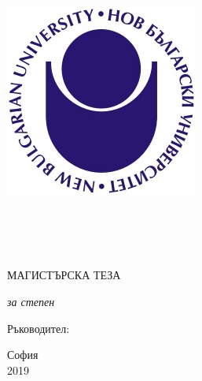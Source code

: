 \documentclass[12pt,bulgarian,singlespacing,headsepline,oneside,openany]{thesis}
\author{\href{https://www.linkedin.com/in/boyana-kantarska-9b1363a3/}{Бояна Радкова \textsc{Кантарска}}}
\begin{document}
\frontmatter

\pagestyle{plain}


\begin{titlepage}
\begin{center}

\vspace*{.01\textheight}

{\scshape \LARGE 
\includegraphics[width=0.08\linewidth]{nbu_logo}
\univname \\[0.5cm] 
\facname \\[0.5cm] 
\deptname \par}

\vspace{1.5cm}
 
\aname

\vspace{1.5cm}

\HRule \\[0.4cm]

{\large \bfseries \ttitle \par}\vspace{0.4cm}

\HRule \\[1.5cm]

\textsc{\Large МАГИСТЪРСКА ТЕЗА}\\[0.5cm] 
 
\vfill

\large \textit{за степен \degreename}\\[1.3cm]

\subjectname \vspace{1.5cm}
 
\vfill

Ръководител: \supname
 
\vfill
 
{\large София \\ 2019}
 
\vfill
\end{center}
\end{titlepage}
\end{document}
